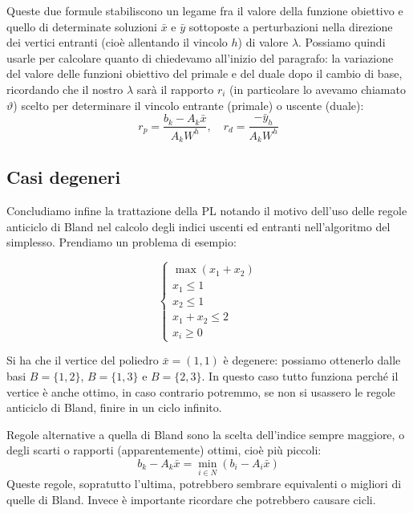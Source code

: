 \documentclass[a4paper,11pt]{article}
\begin{document}
Queste due formule stabiliscono un legame fra il valore della funzione obiettivo e quello di determinate soluzioni $\bar{x}$ e $\bar{y}$ sottoposte a perturbazioni nella direzione dei vertici entranti (cioè allentando il vincolo $h$) di valore $\lambda$.
Possiamo quindi usarle per calcolare quanto di chiedevamo all'inizio del paragrafo: la variazione del valore delle funzioni obiettivo del primale e del duale dopo il cambio di base, ricordando che il nostro $\lambda$ sarà il rapporto $r_i$ (in particolare lo avevamo chiamato $\vartheta$) scelto per determinare il vincolo entrante (primale) o uscente (duale):
$$
r_p = \frac{b_k - A_k \bar{x}}{A_k W^h}, \quad r_d = \frac{-\bar{y}_h}{A_k W^h}
$$

\subsection{Casi degeneri}
Concludiamo infine la trattazione della PL notando il motivo dell'uso delle regole anticiclo di Bland nel calcolo degli indici uscenti ed entranti nell'algoritmo del simplesso.
Prendiamo un problema di esempio:

\[
	\begin{cases}
		\max(x_1 + x_2) \\ 
		x_1 \leq 1 \\ 
		x_2 \leq 1 \\ 
		x_1 + x_2 \leq 2 \\ 
		x_i \geq 0
	\end{cases}
\]

Si ha che il vertice del poliedro $\bar{x} = (1,1)$ è degenere: possiamo ottenerlo dalle basi $B = \{ 1, 2 \}$, $B = \{ 1, 3 \}$ e $B = \{ 2, 3\}$.
In questo caso tutto funziona perché il vertice è anche ottimo, in caso contrario potremmo, se non si usassero le regole anticiclo di Bland, finire in un ciclo infinito.

Regole alternative a quella di Bland sono la scelta dell'indice sempre maggiore, o degli scarti o rapporti (apparentemente) ottimi, cioè più piccoli:
$$
b_k - A_k \bar{x} = \min_{i \in N}\left( b_i - A_i \bar{x} \right)
$$
Queste regole, sopratutto l'ultima, potrebbero sembrare equivalenti o migliori di quelle di Bland.
Invece è importante ricordare che potrebbero causare cicli.
\end{document}
